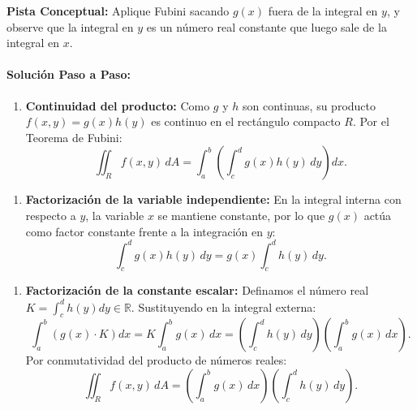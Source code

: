 \documentclass[11pt,a4paper]{article}
\begin{document}
\begin{tcolorbox}[colback=yellow!4,colframe=accentamber!70,arc=1mm,boxrule=0.5pt,left=3mm,right=3mm,top=1.5mm,bottom=1.5mm]
\textbf{Pista Conceptual:} Aplique Fubini sacando $g(x)$ fuera de la integral en $y$, y observe que la integral en $y$ es un número real constante que luego sale de la integral en $x$.
\end{tcolorbox}

\paragraph{Solución Paso a Paso:}\par
\begin{enumerate}[label=\textbf{\arabic*.}]
\item \textbf{Continuidad del producto:}
Como $g$ y $h$ son continuas, su producto $f(x,y) = g(x)h(y)$ es continuo en el rectángulo compacto $R$.
Por el Teorema de Fubini:
\begin{equation*}
\iint_R f(x,y) \, dA = \int_a^b \left( \int_c^d g(x) h(y) \, dy \right) dx.
\end{equation*}
\end{enumerate}

\begin{enumerate}[label=\textbf{\arabic*.}]
\item \textbf{Factorización de la variable independiente:}
En la integral interna con respecto a $y$, la variable $x$ se mantiene constante, por lo que $g(x)$ actúa como factor constante frente a la integración en $y$:
\begin{equation*}
\int_c^d g(x) h(y) \, dy = g(x) \int_c^d h(y) \, dy.
\end{equation*}
\end{enumerate}

\begin{enumerate}[label=\textbf{\arabic*.}]
\item \textbf{Factorización de la constante escalar:}
Definamos el número real $K = \int_c^d h(y) dy \in \mathbb{R}$.
Sustituyendo en la integral externa:
\begin{equation*}
\int_a^b \left( g(x) \cdot K \right) dx = K \int_a^b g(x) \, dx = \left( \int_c^d h(y) \, dy \right) \left( \int_a^b g(x) \, dx \right).
\end{equation*}
Por conmutatividad del producto de números reales:
\begin{equation*}
\iint_R f(x,y) \, dA = \left( \int_a^b g(x) \, dx \right) \left( \int_c^d h(y) \, dy \right).
\end{equation*}
\end{enumerate}
\end{document}
